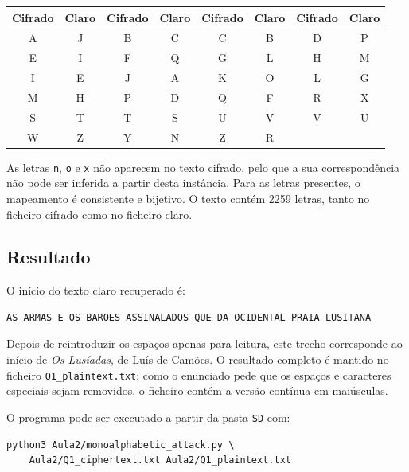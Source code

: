 \documentclass[11pt,a4paper]{article}
\begin{document}
\begin{center}
\small
\begin{tabularx}{\textwidth}{>{\ttfamily}c>{\ttfamily}c@{\quad} >{\ttfamily}c>{\ttfamily}c@{\quad} >{\ttfamily}c>{\ttfamily}c@{\quad} >{\ttfamily}c>{\ttfamily}c}
\toprule
\textbf{Cifrado} & \textbf{Claro} & \textbf{Cifrado} & \textbf{Claro} &
\textbf{Cifrado} & \textbf{Claro} & \textbf{Cifrado} & \textbf{Claro} \\
\midrule
A & J & B & C & C & B & D & P \\
E & I & F & Q & G & L & H & M \\
I & E & J & A & K & O & L & G \\
M & H & P & D & Q & F & R & X \\
S & T & T & S & U & V & V & U \\
W & Z & Y & N & Z & R & & \\
\bottomrule
\end{tabularx}
\end{center}

As letras \texttt{n}, \texttt{o} e \texttt{x} não aparecem no texto cifrado, pelo
que a sua correspondência não pode ser inferida a partir desta instância. Para
as letras presentes, o mapeamento é consistente e bijetivo. O texto contém
2259 letras, tanto no ficheiro cifrado como no ficheiro claro.

\subsection*{Resultado}

O início do texto claro recuperado é:

\begin{verbatim}
AS ARMAS E OS BAROES ASSINALADOS QUE DA OCIDENTAL PRAIA LUSITANA
\end{verbatim}

Depois de reintroduzir os espaços apenas para leitura, este trecho corresponde
ao início de \textit{Os Lusíadas}, de Luís de Camões. O resultado completo é
mantido no ficheiro \texttt{Q1\_plaintext.txt}; como o enunciado pede que os
espaços e caracteres especiais sejam removidos, o ficheiro contém a versão
contínua em maiúsculas.

O programa pode ser executado a partir da pasta \texttt{SD} com:

\begin{verbatim}
python3 Aula2/monoalphabetic_attack.py \
    Aula2/Q1_ciphertext.txt Aula2/Q1_plaintext.txt
\end{verbatim}
\end{document}

